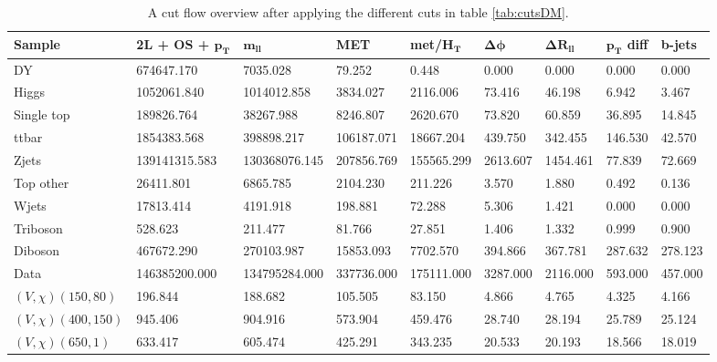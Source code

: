 \begin{landscape}
\begin{table}[H]
    \centering
    \begin{tabular}{l l l l l l l l l}
    \toprule
    \textbf{Sample} & \textbf{2L + OS + $\mathbf{p_T}$} & $\mathbf{m_{ll}}$ & \textbf{MET} & \textbf{met/$\mathbf{H_T}$} & $\mathbf{\Delta \phi}$ & $\mathbf{\Delta R_{ll}}$ & \textbf{$\mathbf{p_T}$} \textbf{diff} & \textbf{b-jets} \\
    \midrule
    \midrule
        DY &  674647.170 & 7035.028 & 79.252 & 0.448 & 0.000 & 0.000 & 0.000 & 0.000\\
        Higgs & 1052061.840 & 1014012.858 & 3834.027 & 2116.006 & 73.416 & 46.198 & 6.942 & 3.467\\
        Single top & 189826.764 & 38267.988 & 8246.807 & 2620.670 & 73.820 & 60.859 & 36.895 & 14.845\\
        ttbar & 1854383.568 & 398898.217 & 106187.071 & 18667.204 & 439.750 & 342.455 & 146.530 & 42.570\\
        Zjets & 139141315.583 & 130368076.145 & 207856.769 & 155565.299 & 2613.607 & 1454.461 & 77.839 & 72.669\\
        Top other & 26411.801 & 6865.785 & 2104.230 & 211.226 & 3.570 & 1.880 & 0.492 & 0.136\\
        Wjets & 17813.414 & 4191.918 & 198.881 & 72.288 & 5.306 & 1.421 & 0.000 & 0.000\\
        Triboson & 528.623 & 211.477 & 81.766 & 27.851 & 1.406 & 1.332 & 0.999 & 0.900\\
        Diboson & 467672.290 & 270103.987 & 15853.093 & 7702.570 & 394.866 & 367.781 & 287.632 & 278.123\\
        Data & 146385200.000 & 134795284.000 & 337736.000 & 175111.000 & 3287.000 & 2116.000 & 593.000 & 457.000\\
        $( V, \chi) (150, 80)$ & 196.844 & 188.682 & 105.505 & 83.150 & 4.866 & 4.765 & 4.325 & 4.166\\
        $( V, \chi) (400, 150)$ & 945.406 & 904.916 & 573.904 & 459.476 & 28.740 & 28.194 & 25.789 & 25.124\\
        $( V, \chi) (650, 1)$  & 633.417 & 605.474 & 425.291 & 343.235 & 20.533 & 20.193 & 18.566 & 18.019\\
        \bottomrule
    \end{tabular}
    \caption{A cut flow overview after applying the different cuts in table \ref{tab:cutsDM}.}
    \label{tab:cutflowDM}
\end{table}
\end{landscape}





